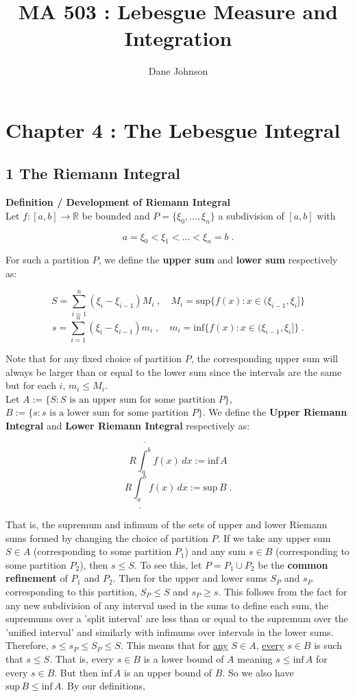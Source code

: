 \documentclass[a4paper]{article}
\title{MA 503 : Lebesgue Measure and Integration}
\author{Dane Johnson}
\begin{document}
\maketitle

\section*{Chapter 4 : The Lebesgue Integral}

\subsection*{1 The Riemann Integral}

{\bf Definition / Development of Riemann Integral}\\

Let $f : [a,b] \rightarrow \mathbb{R}$ be bounded and $P = \{\xi_0, ..., \xi_n\}$ a subdivision of $[a,b]$ with

$$ a = \xi_0 < \xi_1 < ... < \xi_n = b  \;.$$

For such a partition $P$, we define the {\bf upper sum} and {\bf lower sum} respectively as:

$$S = \sum_{i=1}^n (\xi_i - \xi_{i-1})M_i \;, \quad M_i = \text{sup}\{f(x) : x \in (\xi_{i-1}, \xi_{i}] \}$$
$$s = \sum_{i=1}^n (\xi_i - \xi_{i-1})m_i \;, \quad m_i = \text{inf}\{f(x) : x \in (\xi_{i-1}, \xi_{i}] \} \;.$$

Note that for any fixed choice of partition $P$, the corresponding upper sum will always be larger than or equal to the lower sum since the intervals are the same but for each $i$, $m_i \leq M_i$.\\

Let $A:= \{S : S \text{ is an upper sum for some partition } P \}$, $B:= \{s : s \text{ is a lower sum for some partition } P \}$. We define the {\bf Upper Riemann Integral} and {\bf Lower Riemann Integral} respectively as:

$$R\overline{\int_a^b} f(x) \, dx := \text{inf} \, A$$
$$R\underline{\int_a^b} f(x) \, dx := \text{sup} \, B \;.$$

That is, the supremum and infimum of the sets of upper and lower Riemann sums formed by changing the choice of partition $P$. If we take any upper sum $S \in A$ (corresponding to some partition $P_1$) and any sum $s \in B$ (corresponding to some partition $P_2$), then $s \leq S$. To see this, let $P = P_1 \cup P_2$ be the {\bf common refinement} of $P_1$ and $P_2$. Then for the upper and lower sums $S_P$ and $s_P$ corresponding to this partition, $S_P \leq S$ and $s_P \geq s$. This follows from the fact for any new subdivision of any interval used in the sums to define each sum, the supremums over a 'split interval' are less than or equal to the supremum over the 'unified interval' and similarly with infimums over intervals in the lower sums. Therefore, $s \leq s_P \leq S_P \leq S$. This means that for \underline{any} $S \in A$, \underline{every} $s \in B$ is such that $s \leq S$. That is, every $s \in B$ is a lower bound of $A$ meaning $s \leq \text{inf} \, A$ for every $s \in B$. But then  $\text{inf} \, A$ is an upper bound of $B$. So we also have $\text{sup} \, B \leq \text{inf} \, A$. By our definitions,
\end{document}
